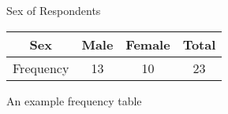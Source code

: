 \begin{figure}[h!]
  
  \centering
  \caption{An example frequency table}
  Sex of Respondents\\
  \begin{tabular}{@{}cccc@{}}
    \toprule
    Sex       & Male & Female & Total \\ \midrule
    Frequency & 13   &   10   & 23     \\ \bottomrule
  \end{tabular}
  
\end{figure}